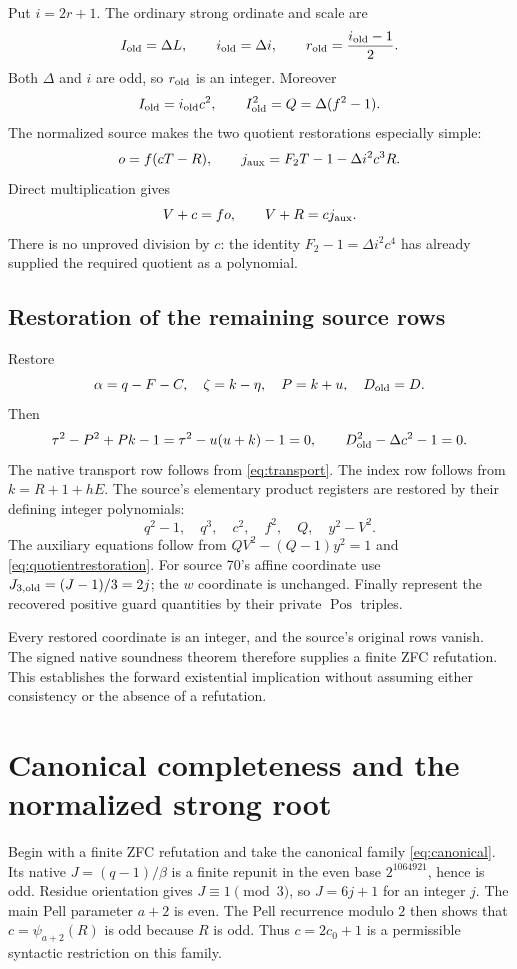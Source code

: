 \documentclass[11pt]{article}
\theoremstyle{definition}
\theoremstyle{remark}
\newcommand{\Pos}{\operatorname{Pos}}
\begin{document}
Put \(i=2r+1\). The ordinary strong ordinate and scale are
\[
 I_{\rm old}=\Delta L,\qquad
 i_{\rm old}=\Delta i,\qquad
 r_{\rm old}=\frac{i_{\rm old}-1}{2}.
\]
Both \(\Delta\) and \(i\) are odd, so \(r_{\rm old}\) is an integer.
Moreover
\[
 I_{\rm old}=i_{\rm old}c^2,\qquad
 I_{\rm old}^2=Q=\Delta(f^2-1).
\]
The normalized source makes the two quotient restorations especially
simple:
\begin{equation}
 o=f(cT-R),\qquad
 j_{\rm aux}=F_2T-1-\Delta i^2c^3R.
 \label{eq:quotientrestoration}
\end{equation}
Direct multiplication gives
\[
 V+c=fo,\qquad V+R=cj_{\rm aux}.
\]
There is no unproved division by \(c\): the identity
\(F_2-1=\Delta i^2c^4\) has already supplied the required quotient as a
polynomial.

\subsection{Restoration of the remaining source rows}

Restore
\[
 \alpha=q-F-C,\quad \zeta=k-\eta,\quad P=k+u,\quad D_{\rm old}=D.
\]
Then
\[
 \tau^2-P^2+Pk-1=\tau^2-u(u+k)-1=0,
 \qquad D_{\rm old}^2-\Delta c^2-1=0.
\]
The native transport row follows from \eqref{eq:transport}. The index
row follows from \(k=R+1+hE\). The source's elementary product registers
are restored by their defining integer polynomials:
\[
 q^2-1,\quad q^3,\quad c^2,\quad f^2,\quad Q,\quad y^2-V^2.
\]
The auxiliary equations follow from
\(QV^2-(Q-1)y^2=1\) and \eqref{eq:quotientrestoration}.
For source 70's affine coordinate use
\(J_{3,\rm old}=(J-1)/3=2j\); the \(w\) coordinate is unchanged.
Finally represent the recovered positive guard quantities by their
private \(\Pos\) triples.

Every restored coordinate is an integer, and the source's original rows
vanish. The signed native soundness theorem therefore supplies a finite
ZFC refutation. This establishes the forward existential implication
without assuming either consistency or the absence of a refutation.

\section{Canonical completeness and the normalized strong root}
\label{sec:complete}

Begin with a finite ZFC refutation and take the canonical family
\eqref{eq:canonical}. Its native
\(J=(q-1)/\beta\) is a finite repunit in the even base
\(2^{1064921}\), hence is odd. Residue orientation gives
\(J\equiv1\pmod3\), so \(J=6j+1\) for an integer \(j\).
The main Pell parameter \(a+2\) is even. The Pell recurrence modulo \(2\)
then shows that \(c=\psi_{a+2}(R)\) is odd because \(R\) is odd.
Thus \(c=2c_0+1\) is a permissible syntactic restriction on this family.
\end{document}
